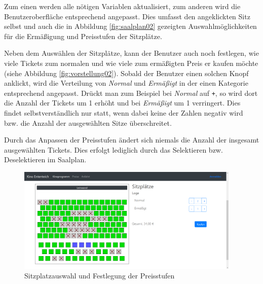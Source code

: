 Zum einen werden alle nötigen Variablen aktualisiert, zum anderen wird die Benutzeroberfläche entsprechend angepasst.
Dies umfasst den angeklickten Sitz selbst und auch die in Abbildung \vref{fig:saalplan02} gezeigten Auswahlmöglichkeiten für die Ermäßigung und Preisstufen der Sitzplätze.

\bigskip

Neben dem Auswählen der Sitzplätze, kann der Benutzer auch noch festlegen, wie viele Tickets zum normalen und wie viele zum ermäßigten Preis er kaufen möchte (siehe Abbildung \vref{fig:vorstellung02}).
Sobald der Benutzer einen solchen Knopf anklickt, wird die Verteilung von \textit{Normal} und \textit{Ermäßigt} in der einen Kategorie entsprechend angepasst.
Drückt man zum Beispiel bei \textit{Normal} auf \texttt{+}, so wird dort die Anzahl der Tickets um 1 erhöht und bei \textit{Ermäßigt} um 1 verringert.
Dies findet selbstverständlich nur statt, wenn dabei keine der Zahlen negativ wird bzw. die Anzahl der ausgewählten Sitze überschreitet.

Durch das Anpassen der Preisstufen ändert sich niemals die Anzahl der insgesamt ausgewählten Tickets.
Dies erfolgt lediglich durch das Selektieren bzw. Deselektieren im Saalplan.

\begin{figure}[ht]
	\centering
	\includegraphics[width=0.95\textwidth]{img/screenshots/vorstellung02}
	\captionsetup{format=hang}
	\caption{Sitzplatzauswahl und Festlegung der Preisstufen}
	\label{fig:vorstellung02}
\end{figure}
